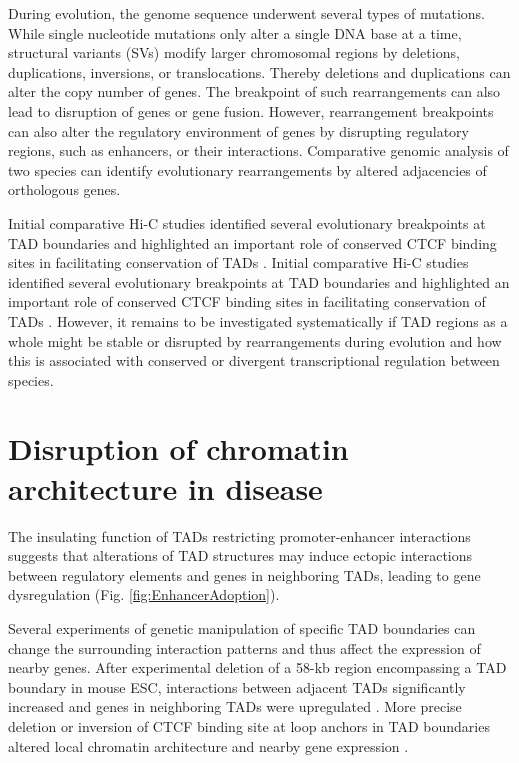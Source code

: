 \documentclass[a4paper,twoside=true,openright,parskip=full,chapterprefix=true,11pt,headings=normal,bibliography=totoc,listof=totoc,titlepage=on,captions=tableabove,draft=false]{scrreprt}
\theoremstyle{definition}
\theoremstyle{definition}
\theoremstyle{definition}
\theoremstyle{remark}
\begin{document}
During evolution, the genome sequence underwent several types of
mutations. While single nucleotide mutations only alter a single DNA
base at a time, structural variants (SVs) modify larger chromosomal
regions by deletions, duplications, inversions, or translocations.
Thereby deletions and duplications can alter the copy number of genes.
The breakpoint of such rearrangements can also lead to disruption of
genes or gene fusion. However, rearrangement breakpoints can also alter
the regulatory environment of genes by disrupting regulatory regions,
such as enhancers, or their interactions. Comparative genomic analysis
of two species can identify evolutionary rearrangements by altered
adjacencies of orthologous genes.

Initial comparative Hi-C studies identified several evolutionary
breakpoints at TAD boundaries and highlighted an important role of
conserved CTCF binding sites in facilitating conservation of TADs
\citep{VietriRudan2015}. Initial comparative Hi-C studies identified
several evolutionary breakpoints at TAD boundaries and highlighted an
important role of conserved CTCF binding sites in facilitating
conservation of TADs \citep{VietriRudan2015}. However, it remains to be
investigated systematically if TAD regions as a whole might be stable or
disrupted by rearrangements during evolution and how this is associated
with conserved or divergent transcriptional regulation between species.

\hypertarget{disruption-of-chromatin-architecture-in-disease}{%
\section{Disruption of chromatin architecture in
disease}\label{disruption-of-chromatin-architecture-in-disease}}

The insulating function of TADs restricting promoter-enhancer
interactions \citep{Symmons2014} suggests that alterations of TAD
structures may induce ectopic interactions between regulatory elements
and genes in neighboring TADs, leading to gene dysregulation (Fig.
\ref{fig:EnhancerAdoption}).

Several experiments of genetic manipulation of specific TAD boundaries
can change the surrounding interaction patterns and thus affect the
expression of nearby genes. After experimental deletion of a 58-kb
region encompassing a TAD boundary in mouse ESC, interactions between
adjacent TADs significantly increased and genes in neighboring TADs were
upregulated \citep{Nora2012}. More precise deletion or inversion of CTCF
binding site at loop anchors in TAD boundaries altered local chromatin
architecture and nearby gene expression
\citep{Dowen2014, Guo2015, Narendra2015}.
\end{document}
